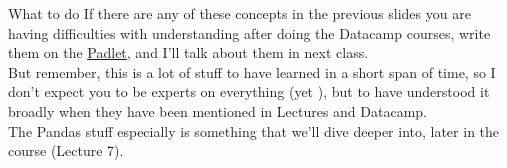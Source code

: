 \documentclass[10pt,danish,t,10pt]{beamer}
\begin{document}
\begin{frame}{What to do}
    If there are any of these concepts in the previous slides you are having difficulties with understanding after doing the Datacamp courses, write them on the  \href{https://padlet.com/hms467/pyzusiexceuhvnme}{\underline{Padlet}}, and I'll talk about them in next class. \\
    But remember, this is a lot of stuff to have learned in a short span of time, so I don't expect you to be experts on everything (yet \Winkey), but to have understood it broadly when they have been mentioned in Lectures and Datacamp. \\
    The Pandas stuff especially is something that we'll dive deeper into, later in the course (Lecture 7).
\end{frame}
\end{document}
